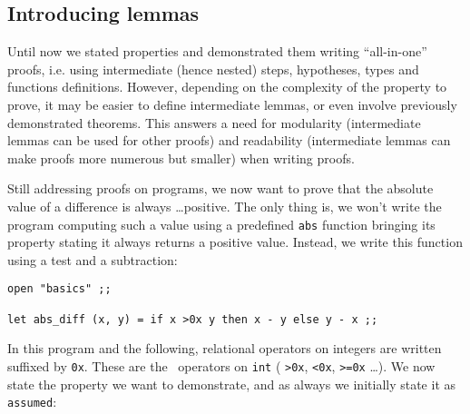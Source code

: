 \documentclass[11pt,a4paper,twoside,onecolumn,fullpage]{article}
\begin{document}
{\scriptsize
}


{\scriptsize
}


\subsection{Introducing lemmas}
Until now we stated properties and demonstrated them writing
``all-in-one'' proofs, i.e. using intermediate (hence nested) steps,
hypotheses, types and functions definitions. However, depending on the
complexity of the property to prove, it may be easier to define
intermediate lemmas, or even involve previously demonstrated
theorems. This answers a need for modularity (intermediate lemmas can
be used for other proofs) and readability (intermediate lemmas can
make proofs more numerous but smaller) when writing proofs.

\medskip
Still addressing proofs on programs, we now want to prove that the
absolute value of a difference is always \ldots positive. The only
thing is, we won't write the program computing such a value using a
predefined {\tt abs} function bringing its property stating it always
returns a positive value. Instead, we write this function using a test
and a subtraction:

{\scriptsize
\begin{lstlisting}[caption=lemmas.fcl]
open "basics" ;;

let abs_diff (x, y) = if x >0x y then x - y else y - x ;;
\end{lstlisting}}

In this program and the following, relational operators on integers
are written suffixed by \lstinline{0x}. These are the \focal\
operators on \lstinline{int} ( \lstinline{>0x}, \lstinline{<0x},
\lstinline{>=0x} \ldots). We now state the property we want to
demonstrate, and as always we initially state it as \lstinline{assumed}:
\end{document}
